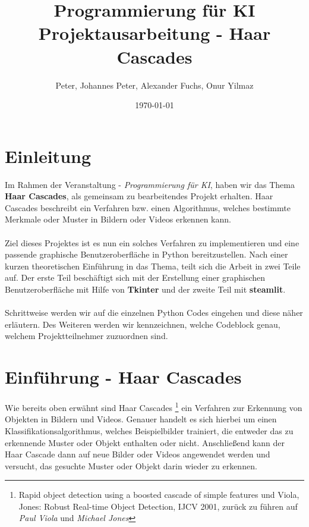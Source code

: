 \documentclass{article}
\begin{document}
\title{Programmierung für KI \\ Projektausarbeitung - Haar Cascades}
\author{Peter, Johannes Peter, Alexander Fuchs, Onur Yilmaz}
\date{\today}
\maketitle
\newpage
	\tableofcontents
	\vspace{2cm} %

\newpage
	
\section*{Einleitung}
Im Rahmen der Veranstaltung - \textit{Programmierung für KI}, haben wir das Thema \textbf{Haar Cascades}, als gemeinsam zu bearbeitendes Projekt erhalten. Haar Cascades beschreibt ein Verfahren bzw. einen Algorithmus, welches bestimmte Merkmale oder Muster in Bildern oder Videos erkennen kann.
\\ \\
Ziel dieses Projektes ist es nun ein solches Verfahren zu implementieren und eine passende graphische Benutzeroberfläche in Python bereitzustellen. Nach einer kurzen theoretischen Einführung in das Thema, teilt sich die Arbeit in zwei Teile auf. 
Der erste Teil beschäftigt sich mit der Erstellung einer graphischen Benutzeroberfläche mit Hilfe von \textbf{Tkinter} und der zweite Teil mit \textbf{steamlit}.
\\ \\
Schrittweise werden wir auf die einzelnen Python Codes eingehen und diese näher erläutern. Des Weiteren werden wir kennzeichnen, welche Codeblock genau, welchem Projektteilnehmer zuzuordnen sind.

\section{Einführung - Haar Cascades}

Wie bereits oben erwähnt sind Haar Cascades \footnote{ Rapid object detection using a boosted cascade of simple features und Viola, Jones: Robust Real-time Object Detection, IJCV 2001, zurück zu führen auf \textit{Paul Viola} und \textit{Michael Jones}} ein Verfahren zur Erkennung von Objekten in Bildern und Videos. Genauer handelt es sich hierbei um einen Klassifikationsalgorithmus, welches Beispielbilder trainiert, die entweder das zu erkennende Muster oder Objekt enthalten oder nicht. Anschließend kann der Haar Cascade dann auf neue Bilder oder Videos angewendet werden und versucht, das gesuchte Muster oder Objekt darin wieder zu erkennen.
\end{document}
